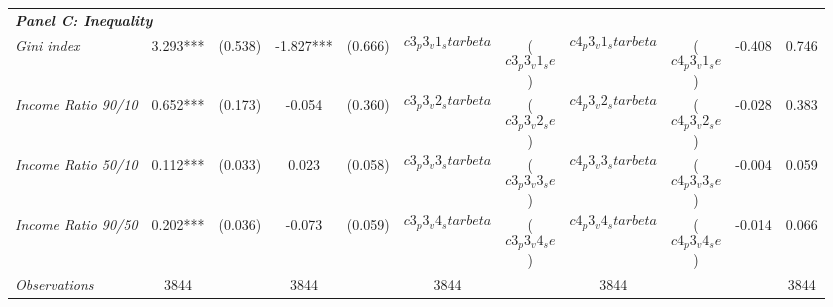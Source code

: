 \begin{tabular}{lcccccccccc}
\midrule                                                                                      
\multicolumn{9}{l}{\textit{\bf Panel  C: Inequality}}   \\[0.2cm]  

\textit{Gini index}  &  3.293***  
					   & (0.538) 
					   &  -1.827***  
					   & (0.666)
					   &  $$c3_p3_v1_starbeta$$  
					   & ($$c3_p3_v1_se$$) 
					   &  $$c4_p3_v1_starbeta$$  
					   & ($$c4_p3_v1_se$$)					   
					   &  -0.408  
					   &  0.746 \\[0.2cm]
					   
\textit{Income Ratio 90/10}  &  0.652***  
					   & (0.173) 
					   &  -0.054  
					   & (0.360)
					   &  $$c3_p3_v2_starbeta$$  
					   & ($$c3_p3_v2_se$$) 
					   &  $$c4_p3_v2_starbeta$$  
					   & ($$c4_p3_v2_se$$)					   
					   &  -0.028  
					   &  0.383 \\[0.2cm]
					   
\textit{Income Ratio 50/10}  &  0.112***  
					   & (0.033) 
					   &  0.023  
					   & (0.058)
					   &  $$c3_p3_v3_starbeta$$  
					   & ($$c3_p3_v3_se$$) 
					   &  $$c4_p3_v3_starbeta$$  
					   & ($$c4_p3_v3_se$$)					   
					   &  -0.004  
					   &  0.059 \\[0.2cm]
					   
\textit{Income Ratio 90/50}  &  0.202***  
					   & (0.036) 
					   &  -0.073  
					   & (0.059)
					   &  $$c3_p3_v4_starbeta$$  
					   & ($$c3_p3_v4_se$$) 
					   &  $$c4_p3_v4_starbeta$$  
					   & ($$c4_p3_v4_se$$)					   
					   &  -0.014  
					   &  0.066 \\[0.2cm]
					   

\midrule

\textit{Observations} 	  &   3844  & & 3844  & &   3844  & & 3844  & &  &   3844 & \\[0.2cm]

\bottomrule

\end{tabular}%

